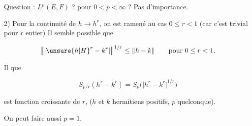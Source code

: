 
Question :    $L^p(E,F)$ ? pour $0<p<\infty$ ? Pas d'importance.

2) Pour la continuité de $h\to h^r$, on est ramené au cas $0\leq r<1$ (car c'est trivial pour $r$ entier) Il semble possible que

\[
\bigl\|\lvert {\unsure{h|H}}^r-k^r\rvert\bigr\|^{1/r}\leq\|h-k\|\qquad\text{pour }0\leq r<1.
\]

Il  que

\[
S_{p/r}(h^r-k^r)=S_p\bigl(\lvert h^r-k^r\rvert^{1/r}\bigr)
\]

est fonction croissante de $r$, ($h$ et $k$ hermitiens positifs, $p$ quelconque).

On peut faire aussi $p=1$.
